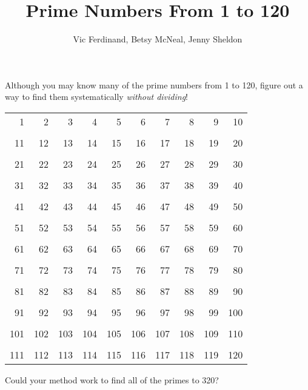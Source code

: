 \documentclass[nooutcomes]{ximera}
\title{Prime Numbers From 1 to 120}
\author{Vic Ferdinand, Betsy McNeal, Jenny Sheldon}
\begin{document}
\begin{abstract} 
\end{abstract}
\maketitle



\begin{problem}
Although you may know many of the prime numbers from 1 to 120, figure
out a way to find them systematically  \textit{without dividing}!

\vspace*{1cm}

\begin{tabular}{r r r r r r r r r r}

  1 &   2 &   3 &   4 &   5 &   6 &   7 &   8 &   9 &  10\\
  \\
 11 &  12 &  13 &  14 &  15 &  16 &  17 &  18 &  19 &  20\\
 \\
 21 &  22 &  23 &  24 &  25 &  26 &  27 &  28 &  29 &  30\\
 \\
 31 &  32 &  33 &  34 &  35 &  36 &  37 &  38 &  39 &  40\\
 \\
 41 &  42 &  43 &  44 &  45 &  46 &  47 &  48 &  49 &  50\\
 \\
 51 &  52 &  53 &  54 &  55 &  56 &  57 &  58 &  59 &  60\\
 \\
 61 &  62 &  63 &  64 &  65 &  66 &  67 &  68 &  69 &  70\\
 \\
 71 &  72 &  73 &  74 &  75 &  76 &  77 &  78 &  79 &  80\\
 \\
 81 &  82 &  83 &  84 &  85 &  86 &  87 &  88 &  89 &  90\\
 \\
 91 &  92 &  93 &  94 &  95 &  96 &  97 &  98 &  99 & 100\\
 \\
101 & 102 & 103 & 104 & 105 & 106 & 107 & 108 & 109 & 110\\
\\
111 & 112 & 113 & 114 & 115 & 116 & 117 & 118 & 119 & 120\\
\end{tabular}

\end{problem}
\begin{problem}
 Could your method work to find all of the primes to 320?
\end{problem}
\end{document}
